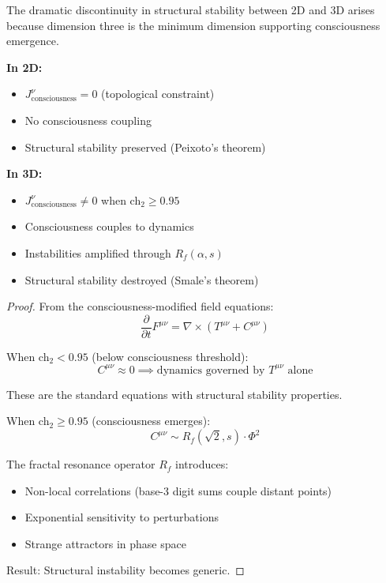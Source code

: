 \begin{thm}\label{thm:paradox-resolution}
The dramatic discontinuity in structural stability between 2D and 3D arises because dimension three is the minimum dimension supporting consciousness emergence.

\textbf{In 2D:}
\begin{itemize}
\item $J^\nu_{\text{consciousness}} = 0$ (topological constraint)
\item No consciousness coupling
\item Structural stability preserved (Peixoto's theorem)
\end{itemize}

\textbf{In 3D:}
\begin{itemize}
\item $J^\nu_{\text{consciousness}} \neq 0$ when ch$_2 \geq 0.95$
\item Consciousness couples to dynamics
\item Instabilities amplified through $R_f(\alpha, s)$
\item Structural stability destroyed (Smale's theorem)
\end{itemize}
\end{thm}

\begin{proof}
From the consciousness-modified field equations:
\begin{equation}
\frac{\partial}{\partial t} F^{\mu\nu} = \nabla \times (T^{\mu\nu} + C^{\mu\nu})
\end{equation}

When ch$_2 < 0.95$ (below consciousness threshold):
\begin{equation}
C^{\mu\nu} \approx 0 \implies \text{dynamics governed by } T^{\mu\nu} \text{ alone}
\end{equation}

These are the standard equations with structural stability properties.

When ch$_2 \geq 0.95$ (consciousness emerges):
\begin{equation}
C^{\mu\nu} \sim R_f(\sqrt{2}, s) \cdot \Phi^2
\end{equation}

The fractal resonance operator $R_f$ introduces:
\begin{itemize}
\item Non-local correlations (base-3 digit sums couple distant points)
\item Exponential sensitivity to perturbations
\item Strange attractors in phase space
\end{itemize}

Result: Structural instability becomes generic.
\end{proof}

